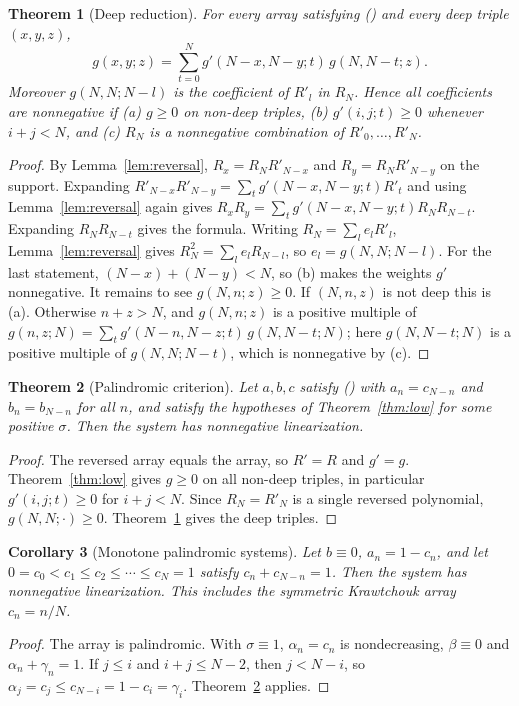 \documentclass[twoside,10pt]{article}
\numberwithin{equation}{section}
\theoremstyle{slbody}
\newtheorem{theorem}{Theorem}[section]
\newtheorem{corollary}[theorem]{Corollary}
\theoremstyle{definition}
\theoremstyle{remark}
\renewcommand{\eqref}[1]{\textup{{\normalfont(\oldstylenums{\ref{#1}}}\normalfont)}}
\begin{document}
\begin{theorem}[Deep reduction]\label{thm:deep}
For every array satisfying \eqref{eq:basic} and every deep triple $(x,y,z)$,
\[
g(x,y;z)=\sum_{t=0}^Ng'(N-x,N-y;t)\,g(N,N-t;z).
\]
Moreover $g(N,N;N-l)$ is the coefficient of $R'_l$ in $R_N$. Hence all coefficients are nonnegative if (a) $g\geq0$ on non-deep triples, (b) $g'(i,j;t)\geq0$ whenever $i+j<N$, and (c) $R_N$ is a nonnegative combination of $R'_0,\ldots,R'_N$.
\end{theorem}
\begin{proof}
By Lemma~\ref{lem:reversal}, $R_x=R_NR'_{N-x}$ and $R_y=R_NR'_{N-y}$ on the support. Expanding $R'_{N-x}R'_{N-y}=\sum_tg'(N-x,N-y;t)R'_t$ and using Lemma~\ref{lem:reversal} again gives $R_xR_y=\sum_tg'(N-x,N-y;t)R_NR_{N-t}$. Expanding $R_NR_{N-t}$ gives the formula. Writing $R_N=\sum_le_lR'_l$, Lemma~\ref{lem:reversal} gives $R_N^2=\sum_le_lR_{N-l}$, so $e_l=g(N,N;N-l)$. For the last statement, $(N-x)+(N-y)<N$, so (b) makes the weights $g'$ nonnegative. It remains to see $g(N,n;z)\geq0$. If $(N,n,z)$ is not deep this is (a). Otherwise $n+z>N$, and $g(N,n;z)$ is a positive multiple of $g(n,z;N)=\sum_tg'(N-n,N-z;t)\,g(N,N-t;N)$; here $g(N,N-t;N)$ is a positive multiple of $g(N,N;N-t)$, which is nonnegative by (c).
\end{proof}

\begin{theorem}[Palindromic criterion]\label{thm:palindromic}
Let $a,b,c$ satisfy \eqref{eq:basic} with $a_n=c_{N-n}$ and $b_n=b_{N-n}$ for all $n$, and satisfy the hypotheses of Theorem~\ref{thm:low} for some positive $\sigma$. Then the system has nonnegative linearization.
\end{theorem}
\begin{proof}
The reversed array equals the array, so $R'=R$ and $g'=g$. Theorem~\ref{thm:low} gives $g\geq0$ on all non-deep triples, in particular $g'(i,j;t)\geq0$ for $i+j<N$. Since $R_N=R'_N$ is a single reversed polynomial, $g(N,N;\cdot)\geq0$. Theorem~\ref{thm:deep} gives the deep triples.
\end{proof}

\begin{corollary}[Monotone palindromic systems]\label{cor:palin}
Let $b\equiv0$, $a_n=1-c_n$, and let $0=c_0<c_1\leq c_2\leq\cdots\leq c_N=1$ satisfy $c_n+c_{N-n}=1$. Then the system has nonnegative linearization. This includes the symmetric Krawtchouk array $c_n=n/N$.
\end{corollary}
\begin{proof}
The array is palindromic. With $\sigma\equiv1$, $\alpha_n=c_n$ is nondecreasing, $\beta\equiv0$ and $\alpha_n+\gamma_n=1$. If $j\leq i$ and $i+j\leq N-2$, then $j<N-i$, so $\alpha_j=c_j\leq c_{N-i}=1-c_i=\gamma_i$. Theorem~\ref{thm:palindromic} applies.
\end{proof}
\end{document}
